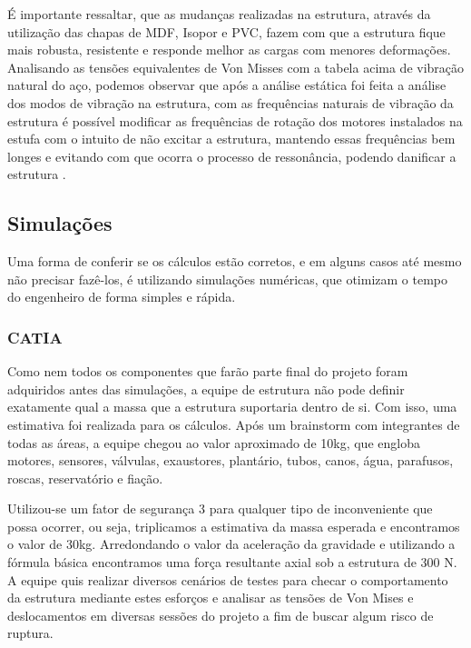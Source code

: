 É importante ressaltar, que as mudanças realizadas na estrutura, através da utilização das chapas de MDF, Isopor e PVC, fazem com que a estrutura fique mais robusta, resistente e responde melhor as cargas com menores deformações. Analisando as tensões equivalentes de Von Misses com a tabela acima de vibração natural do aço, podemos observar que após a análise estática foi feita a análise dos modos de vibração na estrutura, com as frequências naturais de vibração da estrutura é possível modificar as frequências de rotação dos motores instalados na estufa com o intuito de não excitar a estrutura, mantendo essas frequências bem longes e evitando com que ocorra o processo de ressonância, podendo danificar a estrutura \cite{vencci2017}.
\subsection{Simulações}

Uma forma de conferir se os cálculos estão corretos, e em alguns casos até mesmo não precisar fazê-los, é utilizando simulações numéricas, que otimizam o tempo do engenheiro de forma simples e rápida.
\subsubsection{CATIA}

Como nem todos os componentes que farão parte final do projeto foram adquiridos antes das simulações, a equipe de estrutura não pode definir exatamente qual a massa que a estrutura suportaria dentro de si. Com isso, uma estimativa foi realizada para os cálculos. Após um brainstorm com integrantes de todas as áreas, a equipe chegou ao valor aproximado de 10kg, que engloba motores, sensores, válvulas, exaustores, plantário, tubos, canos, água, parafusos, roscas, reservatório e fiação.

Utilizou-se um fator de segurança 3 para qualquer tipo de inconveniente que possa ocorrer, ou seja, triplicamos a estimativa da massa esperada e encontramos o valor de 30kg. Arredondando o valor da aceleração da gravidade e utilizando a fórmula básica  encontramos uma força resultante axial sob a estrutura de 300 N. A equipe quis realizar diversos cenários de testes para checar o comportamento da estrutura mediante estes esforços e analisar as tensões de Von Mises e deslocamentos em diversas sessões do projeto a fim de buscar algum risco de ruptura. 

